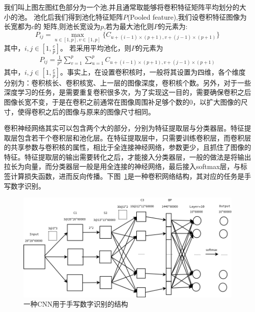 我们叫上图左图红色部分为一个池,并且通常取能够将卷积特征矩阵平均划分的大小的池。
池化后我们得到池化特征矩阵$P$(Pooled feature),我们设卷积特征图像为长宽都为$c$的
矩阵,则池长宽设为$p$,若为最大池化则$P$的元素为:
\begin{equation}
P_{ij}=\max_{u\in[1,p],v\in[1,p]}\{C_{u+(i-1)\times(p+1),v+(j-1)\times(p+1)}\}
\end{equation}
其中，$i,j\in[1,\frac{c}{p}]$。
若采用平均池化，则$P$的元素为
\begin{eqnarray}
P_{ij}=\frac{1}{p^2}\sum_{v=1}^p\sum_{u=1}^pC_{u+(i-1)\times(p+1),v+(j-1)\times(p+1)}
\end{eqnarray}
其中，$i,j\in[1,\frac{c}{p}]$。事实上，在设置卷积核时，一般将其设置为四维，各个维度分别为：卷积核长、卷积核宽、上一层的图像深度，卷积核个数。另外，对于一些深度学习的任务，是需要重复卷积很多次，为了实现这一目的，需要确保卷积之后图像长宽不变，于是在卷积之前通常在图像周围补足够个数的0，以扩大图像的尺寸，使得卷积之后的图像与原来的图像尺寸相同。

卷积神经网络其实可以包含两个大的部分，分别为特征提取层与分类器层。特征提取层包含若干个卷积层和池化层。在特征提取层中，只需要训练卷积层，而卷积层的共享参数与卷积核的属性，相比于全连接神经网络，参数更少，且抓住了图像的特征。特征提取层的输出需要转化之后，才能接入分类器层，一般的做法是将输出拉长为向量，而分类器层一般是用全连接的神经网络，最后接入softmax层，与标签计算损失函数，进而反向传播。下图~\ref{fig:cnn3}是一种卷积网络结构，其对应的任务是手写数字识别。
\begin{figure}[htb]
\centering
\includegraphics[scale=0.4]{../figures/CNN1.png} 
\caption{一种CNN用于手写数字识别的结构}
\label{fig:cnn3}
\end{figure}

